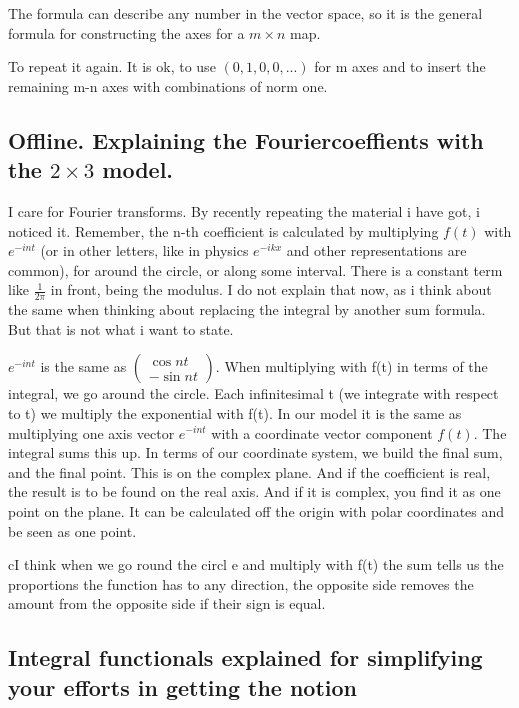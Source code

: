 \documentclass[a4paper]{article}
\begin{document}
The formula can describe any number in the vector space, so it is the general formula for constructing the axes for a $m \times n$ map.

To repeat it again. It is ok, to use $(0,1,0,0,... )$ for m axes and to insert the remaining m-n axes with combinations of norm one.

\subsection{Offline. Explaining the Fouriercoeffients with the $2 \times 3$ model.}

I care for Fourier transforms. By recently repeating the material i have got, i noticed it. Remember, the n-th coefficient is calculated by multiplying $f(t)$ with $e^{-int}$ (or in other letters, like in physics $e^{-ikx}$ and other representations are common), for around the circle, or along some interval. There is a constant term like $\frac{1}{2\pi}$ in front, being the modulus. I do not explain that now, as i think about the same when thinking about replacing the integral by another sum formula. But that is not what i want to state.

$e^{-int}$ is the same as $\begin{pmatrix}\cos nt\\-\sin nt\end{pmatrix}$. When multiplying with f(t) in terms of the integral, we go around the circle. Each infinitesimal t (we integrate with respect to t) we multiply the exponential with f(t). In our model it is the same as multiplying one axis vector $e^{-int}$ with a coordinate vector component $f(t)$. The integral sums this up. In terms of our coordinate system, we build the final sum, and the final point. This is on the complex plane. And if the coefficient is real, the result is to be found on the real axis. And if it is complex, you find it as one point on the plane. It can be calculated off the origin with polar coordinates and be seen as one point. 

cI think when we go round the circl e and multiply with f(t) the sum tells us the proportions the function has to any direction, the opposite side removes the amount from the opposite side if their sign is equal.

\subsection{Integral functionals explained for simplifying your efforts in getting the notion}
\end{document}
